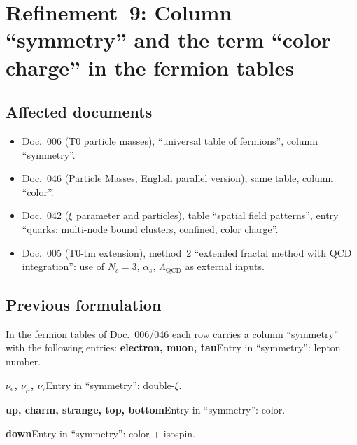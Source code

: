 \section{\texorpdfstring{Refinement~9: Column \enquote{symmetry} and the term \enquote{color charge} in the fermion tables}{Refinement 9: Column symmetry and the term color charge in the fermion tables}}

\subsection*{Affected documents}

\begin{itemize}
  \item Doc.~006 (T0 particle masses), \enquote{universal table of fermions},
        column \enquote{symmetry}.
  \item Doc.~046 (Particle Masses, English parallel version), same table,
        column \enquote{color}.
  \item Doc.~042 ($\xi$ parameter and particles), table
        \enquote{spatial field patterns}, entry
        \enquote{quarks: multi-node bound clusters, confined, color charge}.
  \item Doc.~005 (T0-tm extension), method~2 \enquote{extended fractal method
        with QCD integration}: use of $N_c = 3$, $\alpha_s$,
        $\Lambda_{\text{QCD}}$ as external inputs.
\end{itemize}

\subsection*{Previous formulation}

In the fermion tables of Doc.~006/046 each row carries a column
\enquote{symmetry} with the following entries:
\smallskip\noindent \textbf{electron, muon, tau}\quad Entry in \enquote{symmetry}: lepton number.

\smallskip\noindent \textbf{$\nu_e$, $\nu_\mu$, $\nu_\tau$}\quad Entry in \enquote{symmetry}: double-$\xi$.

\smallskip\noindent \textbf{up, charm, strange, top, bottom}\quad Entry in \enquote{symmetry}: color.

\smallskip\noindent \textbf{down}\quad Entry in \enquote{symmetry}: color + isospin.

\medskip


